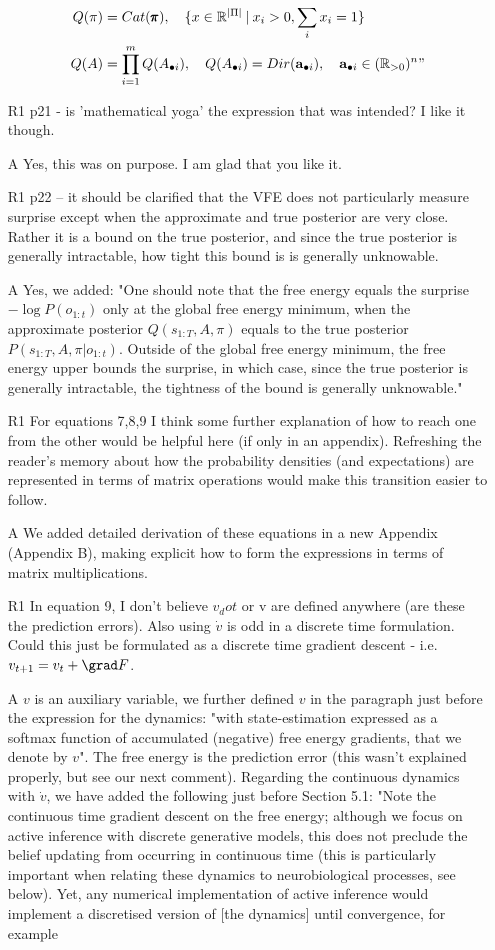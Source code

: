 \documentclass{article}
\begin{document}
\begin{itemize}
\begin{align}
  		  	Q(\pi) &= Cat(\pmb \pi), \quad \{x \in \mathbb R^{|\Pi|} \:|\: x_i >0, \sum_i x_i =1\} \nonumber \\
  		  	Q(A)&= \prod_{i=1}^m Q(A_{\bullet i}) , \quad Q(A_{\bullet i})= Dir(\mathbf a_{\bullet i}), \quad \mathbf a_{\bullet i} \in (\mathbb R_{>0})^n \nonumber"
  		\end{align}
    \item[R1] p21 - is 'mathematical yoga' the expression that was intended? I like it though.
    \item[A] Yes, this was on purpose. I am glad that you like it.
    \item[R1] p22 -- it should be clarified that the VFE does not particularly measure surprise except when the approximate and true posterior are very close. Rather it is a bound on the true posterior, and since the true posterior is generally intractable, how tight this bound is is generally unknowable.
    \item[A] Yes, we added: "One should note that the free energy equals the surprise $-\log P(o_{1:t})$ only at the global free energy minimum, when the approximate posterior $Q(s_{1:T}, A, \pi)$ equals to the true posterior $P(s_{1:T}, A, \pi |o_{1:t})$. Outside of the global free energy minimum, the free energy upper bounds the surprise, in which case, since the true posterior is generally intractable, the tightness of the bound is generally unknowable."
    \item[R1] For equations 7,8,9 I think some further explanation of how to reach one from the other would be helpful here (if only in an appendix). Refreshing the reader's memory about how the probability densities (and expectations) are represented in terms of matrix operations would make this transition easier to follow.
    \item[A] We added detailed derivation of these equations in a new Appendix (Appendix B), making explicit how to form the expressions in terms of matrix multiplications.
    \item[R1] In equation 9, I don't believe $v_dot$ or v are defined anywhere (are these the prediction errors). Also using $\dot v$ is odd in a discrete time formulation. Could this just be formulated as a discrete time gradient descent - i.e. $v_{t+1} = v_t + \grad F$.
    \item[A] $v$ is an auxiliary variable, we further defined $v$ in the paragraph just before the expression for the dynamics: "with state-estimation expressed as a softmax function of accumulated (negative) free energy gradients, that we denote by $v$". The free energy is the prediction error (this wasn't explained properly, but see our next comment). Regarding the continuous dynamics with $\dot v$, we have added the following just before Section 5.1:  "Note the continuous time gradient descent on the free energy; although we focus on active inference with discrete generative models, this does not preclude the belief updating from occurring in continuous time (this is particularly important when relating these dynamics to neurobiological processes, see below). Yet, any numerical implementation of active inference would implement a discretised version of [the dynamics] until convergence, for example

\end{itemize}
\end{document}
